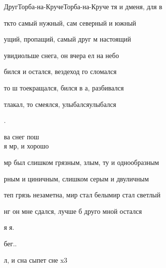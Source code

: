 \documentclass[11pt,a5paper]{book}
\begin{document}
\begin{song}{Друг}{}{Торба-на-Круче}{Торба-на-Круче}{}{}
 тя и дменя, для в \par
{} ткто самый нужный, сам северный и южный \par
{} ущий, пропащий, самый друг м настоящий \par
{} увидиольше снега, он вчера ел на небо \par
{} бился и остался, вездеход го сломался\par 
{} то ш тоекращался, бился в а, разбивался \par
{} тлакал, то смеялся, улыбалсяулыбался \par
{}. \par
{} ва снег пош \\

я мр, и хорошо \par
{} мр был слишком грязным, злым, ту и однообразным \par
{}рным и циничным, слишком серым и двуличным \par
{} теп грязь незаметна, мир стал белымир стал светлый \par
{} нг он мне сдался, лучше б друго мной остался \par
{}я я. \par
{}бег..\par
{}л, и сна сыпет сне x3 \\

\end{song}
\end{document}
